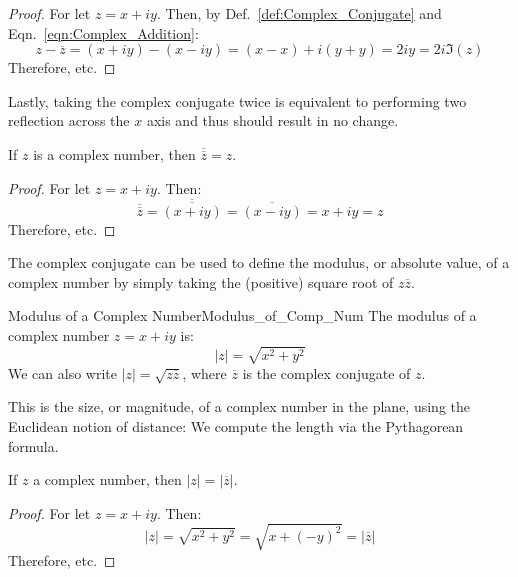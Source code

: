     \begin{proof}
        For let $z=x+iy$. Then, by Def.~\ref{def:Complex_Conjugate}
        and Eqn.~\ref{eqn:Complex_Addition}:
        \begin{equation}
            z-\overline{z}=(x+iy)-(x-iy)
                          =(x-x)+i(y+y)
                          =2iy
                          =2i\Im(z)
        \end{equation}
        Therefore, etc.
    \end{proof}
    Lastly, taking the complex conjugate twice is equivalent to performing
    two reflection across the $x$ axis and thus should result in
    no change.
    \begin{theorem}
        \label{thm:Conj_of_Conj}%
        If $z$ is a complex number, then $\overline{\overline{z}}=z$.
    \end{theorem}
    \begin{proof}
        For let $z=x+iy$. Then:
        \begin{equation}
            \overline{\overline{z}}=\overline{\overline{(x+iy)}}
                                   =\overline{(x-iy)}
                                   =x+iy
                                   =z
        \end{equation}
        Therefore, etc.
    \end{proof}
    The complex conjugate can be used to define the modulus, or
    absolute value, of a complex number by simply taking the (positive)
    square root of $z\overline{z}$.
    \begin{ldefinition}{Modulus of a Complex Number}{Modulus_of_Comp_Num}
        The \gls{modulus} of a complex number $z=x+iy$ is:
        \begin{equation}
            |z|=\sqrt{x^{2}+y^{2}}
        \end{equation}
        We can also write $|z|=\sqrt{z\overline{z}}$, where
        $\overline{z}$ is the complex conjugate of $z$.
    \end{ldefinition}
    This is the size, or magnitude, of a complex number in the plane,
    using the Euclidean notion of distance: We compute the length via
    the Pythagorean formula.
    \begin{theorem}
        \label{thm:Mod_of_z_is_mod_of_conj}%
        If $z$ a complex number, then $|z|=|\overline{z}|$.
    \end{theorem}
    \begin{proof}
        For let $z=x+iy$. Then:
        \begin{equation}
            |z|=\sqrt{x^{2}+y^{2}}=\sqrt{x+(\minus{y})^{2}}=|\overline{z}|
        \end{equation}
        Therefore, etc.
    \end{proof}
